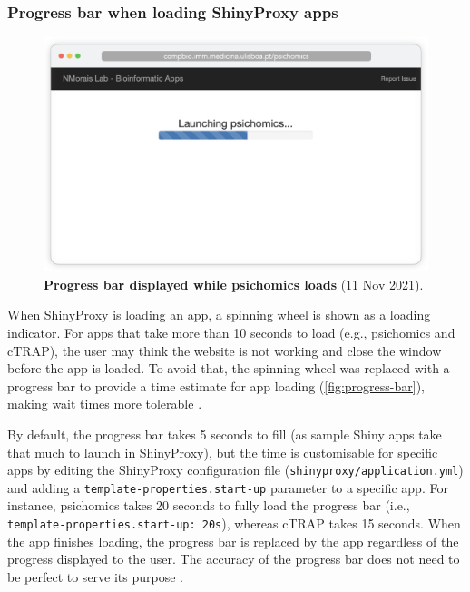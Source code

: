 \subsubsection{Progress bar when loading ShinyProxy apps}

\begin{figure}
  \includegraphics[width=\linewidth]{images/app-server/progress-bar}
  \caption[Screenshot of app loading]{\textbf{Progress bar displayed while psichomics loads} (11 Nov 2021).}
  \label{fig:progress-bar}
  \vspace{-\intextsep}
\end{figure}


When ShinyProxy is loading an app, a spinning wheel is shown as a loading indicator. For apps that take more than 10 seconds to load (e.g., psichomics and cTRAP), the user may think the website is not working and close the window before the app is loaded. To avoid that, the spinning wheel was replaced with a progress bar to provide a time estimate for app loading (\autoref{fig:progress-bar}), making wait times more tolerable \cite{myers:1985aa,yablonski:2020ts}.

\bigskip
\bigskip

By default, the progress bar takes 5 seconds to fill (as sample Shiny apps take that much to launch in ShinyProxy), but the time is customisable for specific apps by editing the ShinyProxy configuration file (\texttt{shinyproxy/application.yml}) and adding a \texttt{template-properties.start-up} parameter to a specific app. For instance, psichomics takes 20 seconds to fully load the progress bar (i.e., \texttt{template-properties.start-up: 20s}), whereas cTRAP takes 15 seconds. When the app finishes loading, the progress bar is replaced by the app regardless of the progress displayed to the user. The accuracy of the progress bar does not need to be perfect to serve its purpose \cite{myers:1985aa,yablonski:2020ts}.

